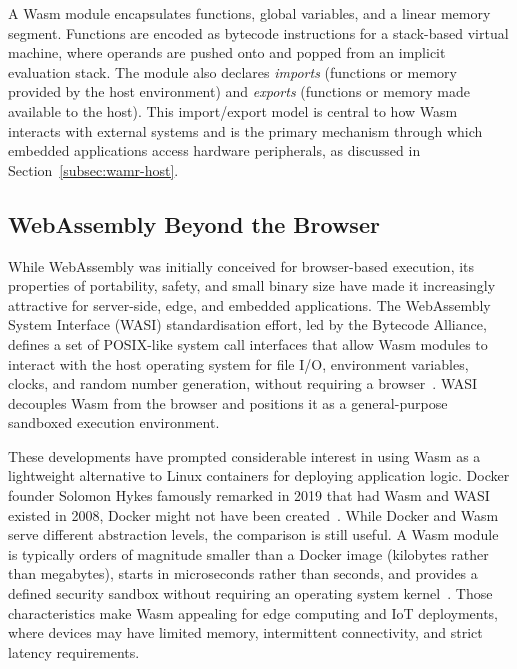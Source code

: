 \documentclass[12pt, a4paper]{report}
\begin{document}
A Wasm module encapsulates functions, global variables, and a linear memory segment. Functions are encoded as bytecode instructions for a stack-based virtual machine, where operands are pushed onto and popped from an implicit evaluation stack. The module also declares \textit{imports} (functions or memory provided by the host environment) and \textit{exports} (functions or memory made available to the host). This import/export model is central to how Wasm interacts with external systems and is the primary mechanism through which embedded applications access hardware peripherals, as discussed in Section~\ref{subsec:wamr-host}.

\subsection{WebAssembly Beyond the Browser}
\label{subsec:wasm-beyond}

While WebAssembly was initially conceived for browser-based execution, its properties of portability, safety, and small binary size have made it increasingly attractive for server-side, edge, and embedded applications. The WebAssembly System Interface (WASI) standardisation effort, led by the Bytecode Alliance, defines a set of POSIX-like system call interfaces that allow Wasm modules to interact with the host operating system for file I/O, environment variables, clocks, and random number generation, without requiring a browser~\cite{wasi-spec}. WASI decouples Wasm from the browser and positions it as a general-purpose sandboxed execution environment.



These developments have prompted considerable interest in using Wasm as a lightweight alternative to Linux containers for deploying application logic. Docker founder Solomon Hykes famously remarked in 2019 that had Wasm and WASI existed in 2008, Docker might not have been created~\cite{hykes-tweet}. While Docker and Wasm serve different abstraction levels, the comparison is still useful. A Wasm module is typically orders of magnitude smaller than a Docker image (kilobytes rather than megabytes), starts in microseconds rather than seconds, and provides a defined security sandbox without requiring an operating system kernel~\cite{wasmedge-comparison}. Those characteristics make Wasm appealing for edge computing and IoT deployments, where devices may have limited memory, intermittent connectivity, and strict latency requirements.
\end{document}
